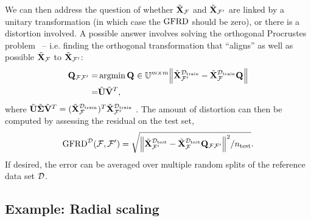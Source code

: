 We can then address the question of whether ${\tilde{\mathbf{X}}}_{\mathcal{F}}$ and ${\tilde{\mathbf{X}}}_{\mathcal{F}^\prime}$ are linked by a unitary transformation (in which case the $\operatorname{GFRD}$ should be zero), or there is a distortion involved.
A possible answer involves solving the orthogonal Procrustes problem~\cite{scho66pm} -- i.e. finding the orthogonal transformation that ``aligns'' as well as possible ${\tilde{\mathbf{X}}}_{\mathcal{F}}$ to ${\tilde{\mathbf{X}}}_{\mathcal{F}^\prime}$:
\begin{equation}
\begin{split}
\mathbf{Q}_{{\mathcal{F}}{\mathcal{F}^\prime}} =& \operatorname{argmin}\mathbf{Q}_{{}{}} \in \mathbb{U}^{m\times m}
\norm{{\tilde{\mathbf{X}}}^{\mathcal{D}_{\mathrm{train}}}_{\mathcal{F}^\prime} - {\tilde{\mathbf{X}}}^{\mathcal{D}_{\mathrm{train}}}_{\mathcal{F}} \mathbf{Q}_{{}{}}  }\\
=&\tilde{\mathbf{U}}\tilde{\mathbf{V}}^T,
\end{split}\label{eq:proc-ff1}
\end{equation}
where $\tilde{\mathbf{U}}\tilde{\boldsymbol{\Sigma}}\tilde{\mathbf{V}}^T = ({\tilde{\mathbf{X}}}_{\mathcal{F}}^{\mathcal{D}_{\mathrm{train}}})^T {\tilde{\mathbf{X}}}^{\mathcal{D}_{\mathrm{train}}}_{\mathcal{F}^\prime}$ .
The amount of distortion can then be computed by assessing the residual on the test set,
\begin{equation}
\operatorname{GFRD}^{\mathcal{D}}(\mathcal{F},\mathcal{F}^\prime) = \sqrt{{\norm{{{\tilde{\mathbf{X}}}}^{\mathcal{D}_{\mathrm{test}}}_{\mathcal{F}^\prime} - {{\tilde{\mathbf{X}}}}^{\mathcal{D}_{\mathrm{test}}}_{\mathcal{F}} \mathbf{Q}_{{\mathcal{F}}{\mathcal{F}^\prime}}  }^2}/n_{\mathrm{test}}}. \label{eq:GFRD}
\end{equation}
If desired, the error can be averaged over multiple random splits of the reference data set $\mathcal{D}$.


\subsection{Example: Radial scaling}

